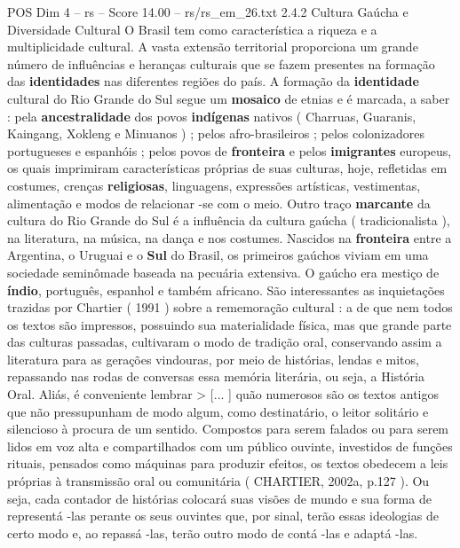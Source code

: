 \begin{textsample}{POS Dim 4 – rs – Score 14.00 – rs/rs\_em\_26.txt}  \label{ex:f4_pos_091}
2.4.2 Cultura Gaúcha e Diversidade Cultural O Brasil tem como característica a riqueza e a multiplicidade cultural.
A vasta extensão territorial proporciona um grande número de influências e heranças culturais que se fazem presentes na formação das \textbf{identidades} nas diferentes regiões do país.
A formação da \textbf{identidade} cultural do Rio Grande do Sul segue um \textbf{mosaico} de etnias e é marcada, a saber : pela \textbf{ancestralidade} dos povos \textbf{indígenas} nativos ( Charruas, Guaranis, Kaingang, Xokleng e Minuanos ) ; pelos afro-brasileiros ; pelos colonizadores portugueses e espanhóis ; pelos povos de \textbf{fronteira} e pelos \textbf{imigrantes} europeus, os quais imprimiram características próprias de suas culturas, hoje, refletidas em costumes, crenças \textbf{religiosas}, linguagens, expressões artísticas, vestimentas, alimentação e modos de relacionar -se com o meio.
Outro traço \textbf{marcante} da cultura do Rio Grande do Sul é a influência da cultura gaúcha ( tradicionalista ), na literatura, na música, na dança e nos costumes.
Nascidos na \textbf{fronteira} entre a Argentina, o Uruguai e o \textbf{Sul} do Brasil, os primeiros gaúchos viviam em uma sociedade seminômade baseada na pecuária extensiva.
O gaúcho era mestiço de \textbf{índio}, português, espanhol e também africano.
São interessantes as inquietações trazidas por Chartier ( 1991 ) sobre a rememoração cultural : a de que nem todos os textos são impressos, possuindo sua materialidade física, mas que grande parte das culturas passadas, cultivaram o modo de tradição oral, conservando assim a literatura para as gerações vindouras, por meio de histórias, lendas e mitos, repassando nas rodas de conversas essa memória literária, ou seja, a História Oral.
Aliás, é conveniente lembrar > [... ] quão numerosos são os textos antigos que não pressupunham de modo algum, como destinatário, o leitor solitário e silencioso à procura de um sentido.
Compostos para serem falados ou para serem lidos em voz alta e compartilhados com um público ouvinte, investidos de funções rituais, pensados como máquinas para produzir efeitos, os textos obedecem a leis próprias à transmissão oral ou comunitária ( CHARTIER, 2002a, p.127 ).
Ou seja, cada contador de histórias colocará suas visões de mundo e sua forma de representá -las perante os seus ouvintes que, por sinal, terão essas ideologias de certo modo e, ao repassá -las, terão outro modo de contá -las e adaptá -las.

\end{textsample}
